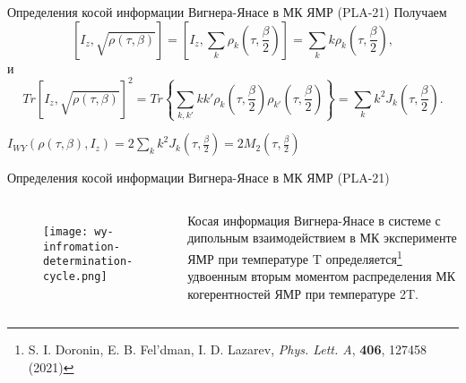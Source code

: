 \begin{frame}{Определения косой информации Вигнера-Янасе в МК ЯМР (PLA-21)}
Получаем
%
$$
    \left[I_z,\sqrt{\rho(\tau,\beta)}\right]
    = \left[I_z, \sum_k \rho_k \left(\tau, \frac{\beta}{2}\right)\right]
    = \sum_k k\rho_k \left(\tau, \frac{\beta}{2}\right),
$$
%
и
%
$$
	Tr\left[I_z,\sqrt{\rho(\tau,\beta)} \right]^2
	= Tr\left\{\sum_{k,k'}kk'
		\rho_k\left(\tau,\frac{\beta}{2}\right)
		\rho_{k'}\left(\tau,\frac{\beta}{2}\right)
	\right\}
	= \sum_k k^2 J_k\left(\tau,\frac{\beta}{2}\right).
$$


\begin{alertblock}{}
\centering
$
  I_{WY}\left(\rho(\tau, \beta), I_z\right)
  = 2\sum_k k^2 J_k\left(\tau, \frac{\beta}{2}\right)
  = 2M_2\left(\tau, \frac{\beta}{2}\right)
$
\end{alertblock}

\end{frame}

\begin{frame}{Определения косой информации Вигнера-Янасе в МК ЯМР (PLA-21)}
  \begin{columns}
  \begin{figure}
    \texttt{[image: wy-infromation-determination-cycle.png]}
  \end{figure}
  Косая информация Вигнера-Янасе в системе с дипольным взаимодействием в МК эксперименте ЯМР при температуре T
  определяется\footnote[frame]{S. I. Doronin, E. B. Fel'dman,  I. D. Lazarev, \textit{Phys. Lett. A}, \textbf{406}, 127458 (2021)}
  удвоенным вторым моментом распределения МК когерентностей ЯМР при температуре 2T.
  \end{columns}
\end{frame}


